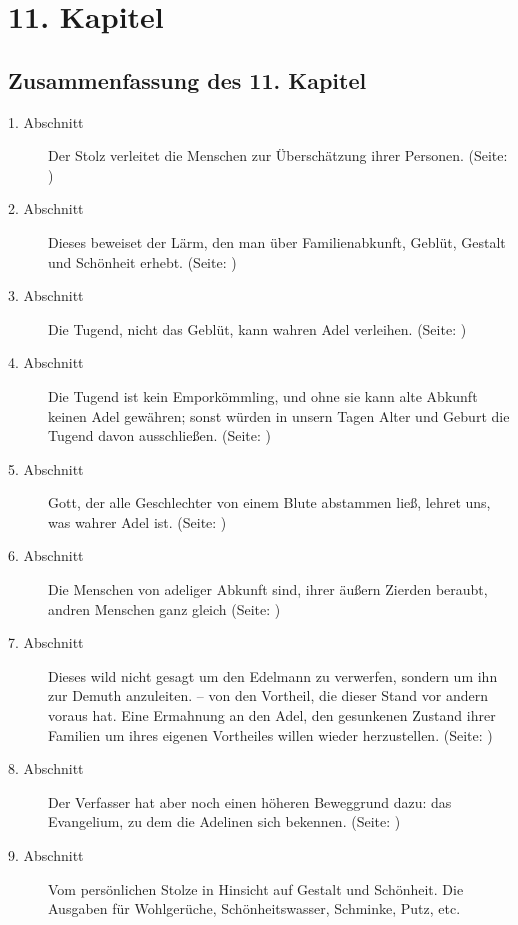 

\chapter{11. Kapitel} \label{kap11}
\section{Zusammenfassung des 11. Kapitel}
\small
\begin{description}
\item[1. Abschnitt] Der Stolz verleitet die Menschen zur Überschätzung ihrer
Personen. (Seite: \pageref{kap11_ab1})
\item[2. Abschnitt] Dieses beweiset der Lärm, den man über Familienabkunft,
Geblüt, Gestalt und Schönheit erhebt. (Seite: \pageref{kap11_ab2})
\item[3. Abschnitt] Die Tugend, nicht das Geblüt, kann wahren Adel verleihen.
(Seite: \pageref{kap11_ab3})
\item[4. Abschnitt] Die Tugend ist kein Emporkömmling, und ohne sie kann alte
Abkunft keinen Adel gewähren; sonst würden in unsern Tagen Alter und Geburt die
Tugend davon ausschließen. (Seite: \pageref{kap11_ab4})
\item[5. Abschnitt] Gott, der alle Geschlechter von einem Blute abstammen ließ,
lehret uns, was wahrer Adel ist. (Seite: \pageref{kap11_ab5})
\item[6. Abschnitt] Die Menschen von adeliger Abkunft sind, ihrer äußern Zierden
beraubt, andren Menschen ganz gleich (Seite: \pageref{kap11_ab6})
\item[7. Abschnitt] Dieses wild nicht gesagt um den Edelmann zu verwerfen,
sondern um ihn zur Demuth anzuleiten. -- von den Vortheil, die dieser Stand vor
andern voraus hat. Eine Ermahnung an den Adel, den gesunkenen Zustand ihrer
Familien um ihres eigenen Vortheiles willen wieder herzustellen. (Seite:
\pageref{kap11_ab7})
\item[8. Abschnitt] Der Verfasser hat aber noch einen höheren Beweggrund dazu:
das Evangelium, zu dem die Adelinen sich bekennen. (Seite: \pageref{kap11_ab8})
\item[9. Abschnitt] Vom persönlichen Stolze in Hinsicht auf Gestalt und
Schönheit. Die Ausgaben für Wohlgerüche, Schönheitswasser, Schminke, Putz, etc.

\end{description}
